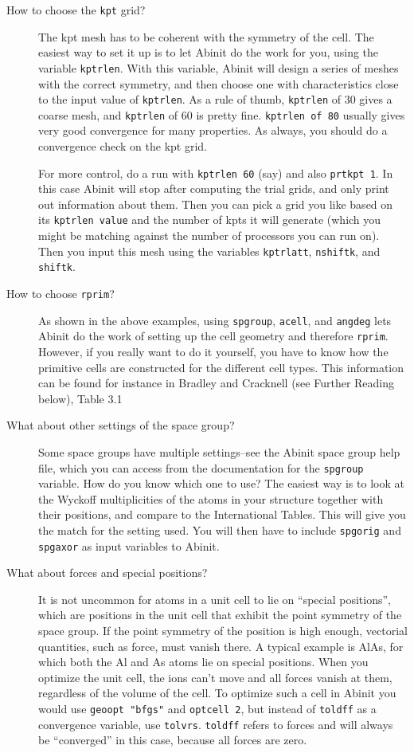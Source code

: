 \documentclass{article}
\begin{document}
\begin{description}

\item[How to choose the {\tt kpt} grid?] The kpt mesh has to be coherent with the symmetry of the cell.
The easiest way to set it up is to let {\sc Abinit} do the work for you, using the variable {\tt kptrlen}.
With this variable, {\sc Abinit} will design a series of meshes with the correct symmetry, and then choose
one with characteristics close to the input value of {\tt kptrlen}. As a rule of thumb, {\tt kptrlen} of 30 gives
a coarse mesh, and {\tt kptrlen} of 60 is pretty fine. {\tt kptrlen of 80} usually gives very good convergence for
many properties. As always, you should do a convergence check on the kpt grid.

For more control, do a run with {\tt kptrlen 60} (say) and also {\tt prtkpt 1}. In this case {\sc Abinit} will stop
after computing the trial grids, and only print out information about them. Then you can pick a grid you like
based on its {\tt kptrlen value} and the number of kpts it will generate (which you might be matching against the
number of processors you can run on). Then you input this mesh using the variables {\tt kptrlatt}, {\tt nshiftk},
and {\tt shiftk}.

\item[How to choose {\tt rprim}?]
As shown in the above examples, using {\tt spgroup}, {\tt acell}, and {\tt angdeg} lets {\sc Abinit} do the work of
setting up the cell geometry and therefore {\tt rprim}. However, if you really want to do it yourself, you have to know
how the primitive cells are constructed for the different cell types. This information can be found for instance in Bradley
and Cracknell (see Further Reading below), Table 3.1

\item[What about other settings of the space group?]
Some space groups have multiple settings--see the {\sc Abinit} space group help file, which you can access from the
documentation for the {\tt spgroup} variable. How do you know which one to use? The easiest way is to look at the
Wyckoff multiplicities of the atoms in your structure together with their positions, and compare to the
International Tables. This will give you the match for the setting used. You will then have to include {\tt spgorig}
and {\tt spgaxor} as input variables to {\sc Abinit}.

\item[What about forces and special positions?]It is not uncommon for atoms in a unit cell to lie on ``special positions'', which
are positions in the unit cell that exhibit the point symmetry of the space group. If the point symmetry of the position is
high enough, vectorial quantities, such as force, must vanish there. A typical example is AlAs, for which both the Al and As
atoms lie on special positions. When you optimize the unit cell, the ions can't move and all forces vanish at them, regardless
of the volume of the cell. To optimize such a cell in {\sc Abinit} you would use {\tt geoopt "bfgs"} and {\tt optcell 2}, but instead
of {\tt toldff} as a convergence variable, use {\tt tolvrs}. {\tt toldff} refers to forces and will always be ``converged'' in this
case, because all forces are zero.


\end{description}
\end{document}
